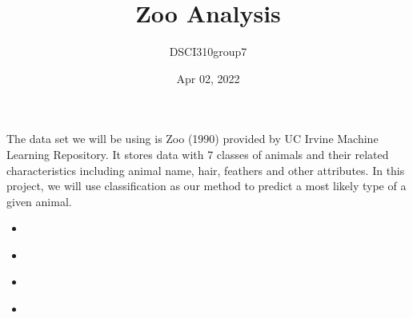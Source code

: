 \documentclass[letterpaper,10pt,english]{jupyterBook}
\title{Zoo Analysis}
\date{Apr 02, 2022}
\author{DSCI310\sphinxhyphen{}group7}
\begin{document}
\pagestyle{empty}
\sphinxmaketitle
\pagestyle{plain}
\sphinxtableofcontents
\pagestyle{normal}
\label{\detokenize{contents::doc}}


\begin{DUlineblock}{0em}
\item[] 
\end{DUlineblock}

\sphinxAtStartPar
The data set we will be using is Zoo (1990) provided by UC Irvine Machine Learning Repository. It stores data with 7 classes of animals and their related characteristics including animal name, hair, feathers and other attributes. In this project, we will use classification as our method to predict a most likely type of a given animal.

\sphinxAtStartPar
{}
\begin{itemize}
\item {} 
\sphinxAtStartPar
{\hyperref[\detokenize{intro::doc}]{}}

\item {} 
\sphinxAtStartPar
{\hyperref[\detokenize{analysis::doc}]{}}

\item {} 
\sphinxAtStartPar
{\hyperref[\detokenize{discussion::doc}]{}}

\item {} 
\sphinxAtStartPar
{\hyperref[\detokenize{references::doc}]{}}

\end{itemize}

\sphinxstepscope
\end{document}
